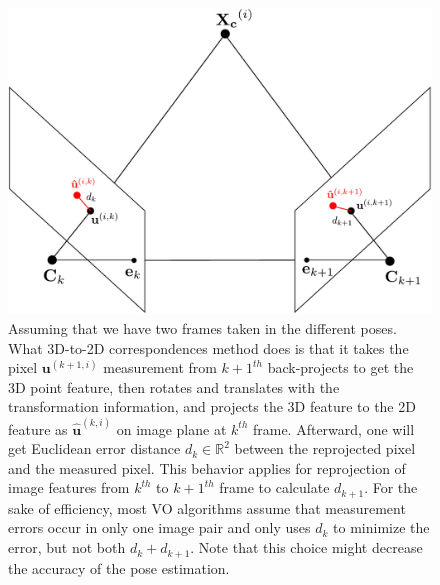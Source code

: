 \documentclass[a4paper]{report}
\numberwithin{figure}{section}
\newcommand{\R}{\mathbb{R}}
\begin{document}
\begin{figure}[H]
	\centering
  \includegraphics[width=0.9\linewidth,natwidth=640,natheight=640]
  {fig/drawings/3d_to_2d.pdf}
  \caption[3D-to-2D Correspondences]{Assuming that we have two frames taken in 
  the different poses. What 3D-to-2D correspondences method does is that it 
  takes the pixel $\mathbf{u}^{(k+1,i)}$ measurement from $k+1^{th}$ 
  back-projects to get the 3D point feature, then rotates and translates with 
  the transformation information, and projects the 3D feature to the 2D 
  feature as $\mathbf{\hat{u}}^{(k,i)}$ on image plane at $k^{th}$ frame. 
  Afterward, one will get Euclidean error distance $d_k \in \R^2$ between the 
  reprojected pixel and the measured pixel. This behavior applies for 
  reprojection of image features from $k^{th}$ to $k+1^{th}$ frame to 
  calculate $d_{k+1}$. 
  For the sake of efficiency, most VO algorithms assume that measurement 
  errors occur in only one image pair and only uses $d_k$ to minimize the 
  error, but not both $d_k+d_{k+1}$. Note that 
  this choice might decrease the accuracy of the 
  pose estimation.}
	\label{fig:min_geometric_error}
\end{figure}
\end{document}

